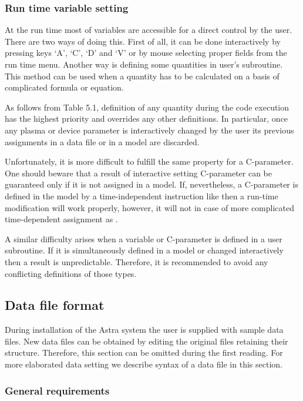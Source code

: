 \subsubsection{Run time variable setting}

At the run time most of variables are accessible for a direct
control by the user. 
There are two ways of doing this.
First of all, it can be done interactively by pressing keys 
`A', `C', `D' and `V' or by mouse selecting proper fields from the 
run time menu. 
Another way is defining some quantities in user's subroutine.
This method can be used when a quantity has to be calculated on a
basis of complicated formula or equation.

As follows from Table 5.1, definition of any quantity during the code
execution has the highest priority and overrides any other definitions.
In particular, once any plasma or device parameter is interactively
changed by the user its previous assignments in a data file or in a
model are discarded. 

Unfortunately, it is more difficult to fulfill the same property for a 
C-parameter.
One should beware that a result of interactive setting C-parameter can
be guaranteed only if it is not assigned in a model. 
If, nevertheless, a C-parameter is defined in the model by a
time-independent instruction like  then a run-time
modification will work properly, however, it will not in case of more
complicated time-dependent assignment as . 

A similar difficulty arises when a variable or C-parameter is defined in
a user subroutine. 
If it is simultaneously defined in a model or changed interactively then
a result is unpredictable.
Therefore, it is recommended to avoid any conflicting definitions
of those types.

\subsection{Data file format}

During installation of the Astra system the user is supplied with 
sample data files. 
New data files can be obtained by editing the 
original files retaining their structure. 
Therefore, this section can be omitted during the first reading. 
For more elaborated data setting we describe syntax of a 
data file in this section.

\subsubsection{General requirements}

